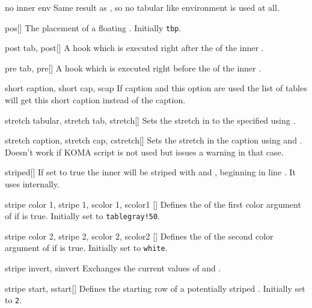 \begin{describeopt}{no inner env}%
  Same result as , so no tabular like
  environment is used at all.
\end{describeopt}%
\begin{describeopt}{pos}[]%
  The placement of a floating . Initially \texttt{tbp}.
\end{describeopt}%
\begin{describeopt}{post tab, post}[]%
  A hook which is executed right after the  of the inner
  .
\end{describeopt}%
\begin{describeopt}{pre tab, pre}[]%
  A hook which is executed right before the  of the inner
  .
\end{describeopt}%
\begin{describeopt}{short caption, short cap, scap}%
  If caption and this option are used the list of tables will get this short
  caption instead of the caption.
\end{describeopt}%
\begin{describeopt}{stretch tabular, stretch tab, stretch}[]%
  Sets the stretch in  to the specified  using
  .
\end{describeopt}%
\begin{describeopt}{stretch caption, stretch cap, cstretch}[]%
  Sets the stretch in the caption using  and .
  Doesn't work if KOMA script is not used but issues a warning in that case.
\end{describeopt}%
\begin{describeopt}{striped}[]%
  If set to true the inner  will be striped with  and , beginning in line . It
  uses  internally.
\end{describeopt}%
\begin{describeopt}{stripe color 1, stripe 1, scolor 1, scolor1}%
  []
  Defines the  of the first color argument of  if
   is true. Initially set to \texttt{tablegray!50}.
\end{describeopt}%
\begin{describeopt}{stripe color 2, stripe 2, scolor 2, scolor2}%
  []
  Defines the  of the second color argument of  if
   is true. Initially set to \texttt{white}.
\end{describeopt}%
\begin{describeopt}{stripe invert, sinvert}%
  Exchanges the current values of  and .
\end{describeopt}%
\begin{describeopt}{stripe start, sstart}[]%
  Defines the starting row of a potentially striped . Initially
  set to \texttt{2}.
\end{describeopt}%

